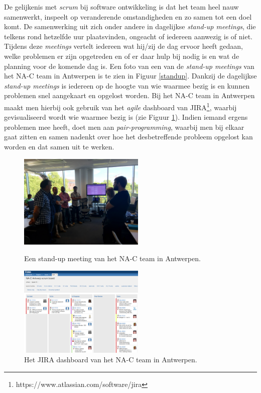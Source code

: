 \documentclass[10pt,a4paper]{article}
\begin{document}
De gelijkenis met \textit{scrum} bij software ontwikkeling is dat het team heel nauw samenwerkt, inspeelt op veranderende omstandigheden en zo samen tot een doel komt. De samenwerking uit zich onder andere in dagelijkse \textit{stand-up meetings}, die telkens rond hetzelfde uur plaatsvinden, ongeacht of iedereen aanwezig is of niet. Tijdens deze \textit{meetings} vertelt iedereen wat hij/zij de dag ervoor heeft gedaan, welke problemen er zijn opgetreden en of er daar hulp bij nodig is en wat de planning voor de komende dag is. Een foto van een van de \textit{stand-up meetings} van het NA-C team in Antwerpen is te zien in Figuur \ref{standup}. Dankzij de dagelijkse \textit{stand-up meetings} is iedereen op de hoogte van wie waarmee bezig is en kunnen problemen snel aangekaart en opgelost worden. Bij het NA-C team in Antwerpen maakt men hierbij ook gebruik van het \textit{agile} dashboard van JIRA\footnote{https://www.atlassian.com/software/jira}, waarbij gevisualiseerd wordt wie waarmee bezig is (zie Figuur \ref{jira}). Indien iemand ergens problemen mee heeft, doet men aan \textit{pair-programming}, waarbij men bij elkaar gaat zitten en samen nadenkt over hoe het desbetreffende probleem opgelost kan worden en dat samen uit te werken.\\

\begin{figure}
\centering
\begin{minipage}{0.45\textwidth}
\centering
\includegraphics[width=60mm]{standupmeeting.jpg}
\caption{Een stand-up meeting van het NA-C team in Antwerpen.}
\label{standup}
\end{minipage}\hfill
\begin{minipage}{0.45\textwidth}
\centering
\includegraphics[width=60mm]{CaptureJira.png}
\caption{Het JIRA dashboard van het NA-C team in Antwerpen.}
\label{jira}
\end{minipage}
\end{figure}
\end{document}

